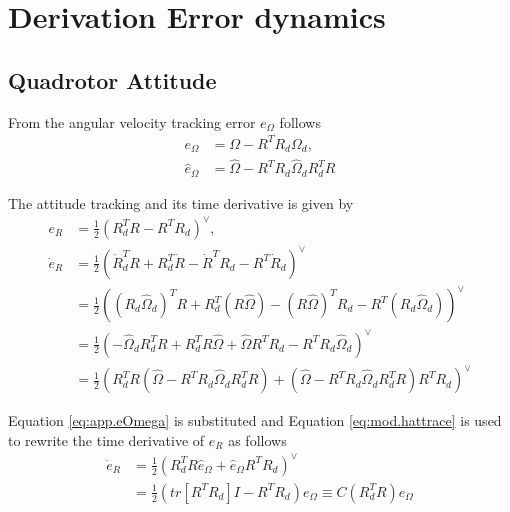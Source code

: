 
\section{Derivation Error dynamics}\label{sec:app.error}
\subsection{Quadrotor Attitude}
From the angular velocity tracking error $ e_\Omega $ follows
\begin{equation}\label{eq:app.eOmega}
\begin{aligned}
e_\Omega&=\Omega-R^TR_d\Omega_d,\\
\hat{e}_\Omega&=\hat{\Omega}-R^TR_d\hat{\Omega}_dR_d^TR
\end{aligned}
\end{equation}

The attitude tracking and its time derivative is given by
\begin{equation}\label{key}
\begin{aligned}
e_R&=\frac{1}{2}(R_d^TR-R^TR_d)^\vee,\\
\dot{e}_R&=\frac{1}{2}(\dot{R}_d^TR+R_d^T\dot{R}-\dot{R}^TR_d-R^T\dot{R}_d)^\vee\\
&=\frac{1}{2}((R_d\hat{\Omega}_d)^TR+R_d^T(R\hat{\Omega})-(R\hat{\Omega})^TR_d-R^T(R_d\hat{\Omega}_d))^\vee\\
&=\frac{1}{2}(-\hat{\Omega}_dR_d^TR+R_d^TR\hat{\Omega}+\hat{\Omega}R^TR_d-R^TR_d\hat{\Omega}_d)^\vee\\
&=\frac{1}{2}(R_d^TR(\hat{\Omega}-R^TR_d\hat{\Omega}_dR_d^TR)+(\hat{\Omega}-R^TR_d\hat{\Omega}_dR_d^TR)R^TR_d)^\vee
\end{aligned}
\end{equation}

Equation \ref{eq:app.eOmega} is substituted and Equation \ref{eq:mod.hattrace} is used to rewrite the time derivative of $ e_R $ as follows
\begin{equation}\label{key}
\begin{aligned}
\dot{e}_R&=\frac{1}{2}(R_d^TR\hat{e}_\Omega+\hat{e}_\Omega R^TR_d)^\vee\\
&=\frac{1}{2}(tr[R^TR_d]I-R^TR_d)e_\Omega \equiv C(R_d^TR)e_\Omega
\end{aligned}
\end{equation}

